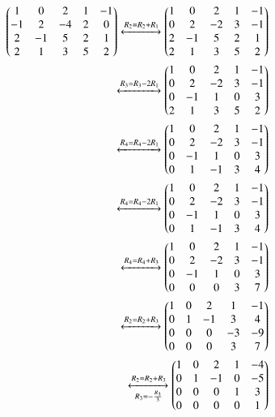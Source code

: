 \documentclass[journal,12pt,twocolumn]{IEEEtran}
\begin{document}
\begin{align}
    \begin{pmatrix}1 & 0 & 2 & 1 & -1 \\
           -1 & 2 & -4 & 2 & 0 \\
           2 & -1 & 5 & 2 & 1 \\
           2 & 1 & 3 & 5 & 2\end{pmatrix} 
           \xleftrightarrow{R_2 = R_2+R_1}
           \begin{pmatrix}1 & 0 & 2 & 1 & -1 \\
           0 & 2 & -2 & 3 & -1 \\
           2 & -1 & 5 & 2 & 1 \\
           2 & 1 & 3 & 5 & 2\end{pmatrix}\\
           \xleftrightarrow{R_3 = R_3-2R_1}
            \begin{pmatrix}1 & 0 & 2 & 1 & -1 \\
            0 & 2 & -2 & 3 & -1 \\
            0 & -1 & 1 & 0 & 3 \\
            2 & 1 & 3 & 5 & 2\end{pmatrix}\\ 
            \xleftrightarrow{R_4 = R_4-2R_1}
            \begin{pmatrix}1 & 0 & 2 & 1 & -1 \\
            0 & 2 & -2 & 3 & -1 \\
            0 & -1 & 1 & 0 & 3 \\
            0 & 1 & -1 & 3 & 4\end{pmatrix}\\
            \xleftrightarrow{R_4 = R_4-2R_1}
            \begin{pmatrix}1 & 0 & 2 & 1 & -1 \\
            0 & 2 & -2 & 3 & -1 \\
            0 & -1 & 1 & 0 & 3 \\
            0 & 1 & -1 & 3 & 4\end{pmatrix}\\
            \xleftrightarrow{R_4 = R_4+R_3}
            \begin{pmatrix}1 & 0 & 2 & 1 & -1 \\
            0 & 2 & -2 & 3 & -1 \\
            0 & -1 & 1 & 0 & 3 \\
            0 & 0 & 0 & 3 & 7\end{pmatrix}\\
            \xleftrightarrow{R_2 = R_2+R_3}
            \begin{pmatrix}1 & 0 & 2 & 1 & -1 \\
            0 & 1 & -1 & 3 & 4 \\
            0 & 0 & 0 & -3 & -9 \\
            0 & 0 & 0 & 3 & 7\end{pmatrix}\\
            \xleftrightarrow[R_3 = -\frac{R_3}{3}]{R_2 = R_2+R_3}
            \begin{pmatrix}1 & 0 & 2 & 1 & -4 \\
            0 & 1 & -1 & 0 & -5 \\
            0 & 0 & 0 & 1 & 3 \\
            0 & 0 & 0 & 0 & 1\end{pmatrix}
\end{align}
\end{document}
